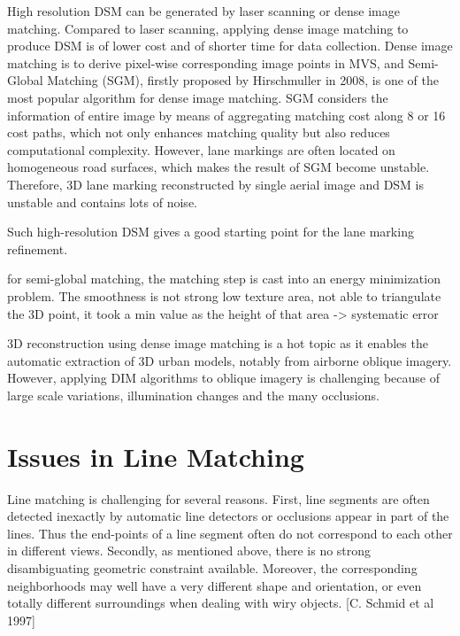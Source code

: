 High resolution DSM can be generated by laser scanning or dense image matching. Compared to laser scanning, applying dense image matching to produce DSM is of lower cost and of shorter time for data collection. Dense image matching is to derive pixel-wise corresponding image points in MVS, and Semi-Global Matching (SGM), firstly proposed by Hirschmuller in 2008, is one of the most popular algorithm for dense image matching. SGM considers the information of entire image by means of aggregating matching cost along 8 or 16 cost paths, which not only enhances matching quality but also reduces computational complexity. However, lane markings are often located on homogeneous road surfaces, which makes the result of SGM become unstable. Therefore, 3D lane marking reconstructed by single aerial image and DSM is unstable and contains lots of noise. %

Such high-resolution DSM gives a good starting point for the lane marking refinement.

for semi-global matching, the matching step is cast into an energy minimization problem.
The smoothness is not strong
low texture area, not able to triangulate the 3D point, it took a min value as the height of that area -> systematic error


3D reconstruction using dense image matching is a hot topic as it enables the automatic extraction of 3D urban models, notably from airborne oblique imagery. However, applying DIM algorithms to oblique imagery is challenging because of large scale variations, illumination changes and the many occlusions.



\section{Issues in Line Matching}

Line matching is challenging for several reasons. First, line segments are often detected inexactly by automatic line detectors or occlusions appear in part of the lines. Thus the end-points of a line segment often do not correspond to each other in different views. Secondly, as mentioned above, there is no strong disambiguating geometric constraint available. Moreover, the corresponding neighborhoods may well have a very different shape and orientation, or even totally different surroundings when dealing with wiry objects. [C. Schmid et al 1997] 

\cite{HoferFeb2013}

